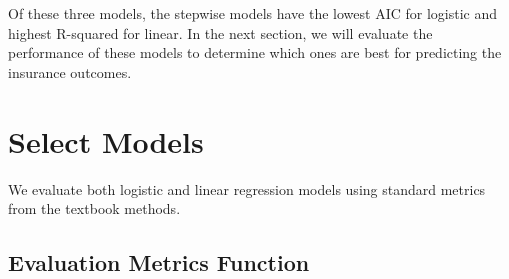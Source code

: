 \documentclass[
  11pt]{article}
\begin{document}
Of these three models, the stepwise models have the lowest AIC for
logistic and highest R-squared for linear. In the next section, we will
evaluate the performance of these models to determine which ones are
best for predicting the insurance outcomes.

\section{Select Models}\label{select-models}

We evaluate both logistic and linear regression models using standard
metrics from the textbook methods.

\subsection{Evaluation Metrics
Function}\label{evaluation-metrics-function}
\end{document}
